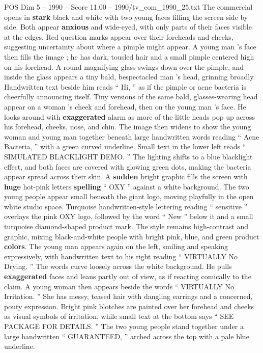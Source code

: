 \begin{textsample}{POS Dim 5 – 1990 – Score 11.00 – 1990/tv\_com\_1990\_25.txt}  \label{ex:f5_pos_009}
The commercial opens in \textbf{stark} black and white with two young faces filling the screen side by side.
Both appear \textbf{anxious} and wide-eyed, with only parts of their faces visible at the edges.
Red question marks appear over their foreheads and cheeks, suggesting uncertainty about where a pimple might appear.
A young man ’s face then fills the image ; he has dark, tousled hair and a small pimple centered high on his forehead.
A round magnifying glass swings down over the pimple, and inside the glass appears a tiny bald, bespectacled man ’s head, grinning broadly.
Handwritten text beside him reads “ Hi, ” as if the pimple or acne bacteria is cheerfully announcing itself.
Tiny versions of the same bald, glasses-wearing head appear on a woman ’s cheek and forehead, then on the young man ’s face.
He looks around with \textbf{exaggerated} alarm as more of the little heads pop up across his forehead, cheeks, nose, and chin.
The image then widens to show the young woman and young man together beneath large handwritten words reading “ Acne Bacteria, ” with a green curved underline.
Small text in the lower left reads “ SIMULATED BLACKLIGHT DEMO. ” The lighting shifts to a blue blacklight effect, and both faces are covered with glowing green dots, making the bacteria appear spread across their skin.
A \textbf{sudden} bright graphic fills the screen with \textbf{huge} hot-pink letters \textbf{spelling} “ OXY ” against a white background.
The two young people appear small beneath the giant logo, moving playfully in the open white studio space.
Turquoise handwritten-style lettering reading “ sensitive ” overlays the pink OXY logo, followed by the word “ New ” below it and a small turquoise diamond-shaped product mark.
The style remains high-contrast and graphic, mixing black-and-white people with bright pink, blue, and green product \textbf{colors}.
The young man appears again on the left, smiling and speaking expressively, with handwritten text to his right reading “ VIRTUALLY No Drying. ” The words curve loosely across the white background.
He pulls \textbf{exaggerated} faces and leans partly out of view, as if reacting comically to the claim.
A young woman then appears beside the words “ VIRTUALLY No Irritation. ” She has messy, teased hair with dangling earrings and a concerned, pouty expression.
Bright pink blotches are painted over her forehead and cheeks as visual symbols of irritation, while small text at the bottom says “ SEE PACKAGE FOR DETAILS. ” The two young people stand together under a large handwritten “ GUARANTEED, ” arched across the top with a pale blue underline.

\end{textsample}

